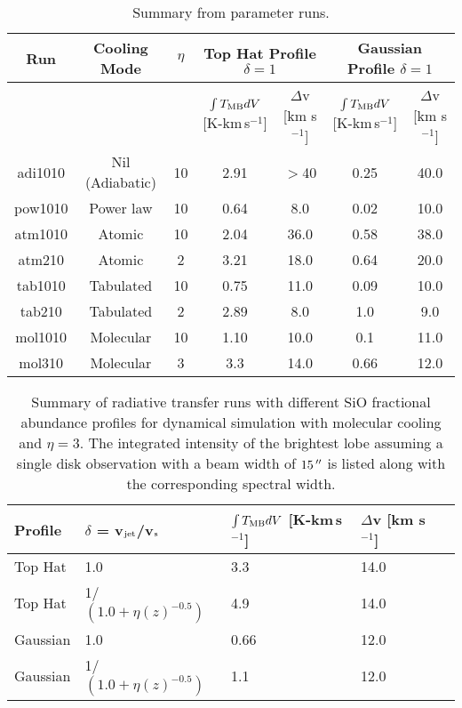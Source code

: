 \documentclass[useAMS,usenatbib,letters]{mn2e}
\begin{document}
\begin{table*}
\centering
\caption{Summary from parameter runs.}
\begin{tabular}{c | c | c | c | c | c | c }
\hline
Run & Cooling Mode & $\eta$ & \multicolumn{2}{|c|}{Top Hat Profile
  $\delta = 1$} & \multicolumn{2}{|c|}{Gaussian Profile $\delta =
  1$}\\
\hline\hline
&&& $\int T_{\rm MB}dV$ [K-km\,s$^{-1}$] & $\Delta$v [km s$^{-1}$] & $\int T_{\rm MB}dV$ [K-km\,s$^{-1}$] & $\Delta$v [km s$^{-1}$] \\
\hline
adi1010 & Nil (Adiabatic) & 10 & 2.91 & $>$40 & 0.25 & 40.0 \\
pow1010 & Power law & 10 & 0.64 & 8.0 & 0.02 & 10.0\\
atm1010 & Atomic & 10 & 2.04 & 36.0 & 0.58 & 38.0 \\
atm210 & Atomic & 2 & 3.21 & 18.0 & 0.64 & 20.0 \\
tab1010 & Tabulated & 10 & 0.75 & 11.0 & 0.09 & 10.0 \\
tab210 & Tabulated & 2 & 2.89 & 8.0 & 1.0 & 9.0 \\
mol1010 & Molecular & 10 & 1.10 & 10.0 & 0.1 & 11.0 \\
mol310 & Molecular & 3 & 3.3 & 14.0 & 0.66 & 12.0\\
\hline
\end{tabular}
\label{tab:result1}
\end{table*}


 

\begin{table*}
\centering
\caption{Summary of radiative transfer runs with different SiO fractional abundance
  profiles for dynamical simulation with molecular cooling and
  $\eta=3$. The integrated intensity of the brightest lobe assuming a single disk
  observation with a beam width of $15\,\hbox{$^{\prime\prime}$}$ is listed along with the
  corresponding spectral width.}
\begin{tabular}{l | l | l | l | l}
\hline
Profile & $\delta$ = v$_{\rm jet}$/v$_{\rm s}$ & $\int T_{\rm MB}dV$
[K-km\,s$^{-1}$] & $\Delta$v [km s$^{-1}$]\\ 
\hline\hline
Top Hat & 1.0 & 3.3 & 14.0 \\
Top Hat & 1/$(1.0 + \eta(z)^{-0.5})$ & 4.9 & 14.0 \\
Gaussian & 1.0 & 0.66
& 12.0 \\
Gaussian & 1/$(1.0 + \eta(z)^{-0.5})$ & 1.1
& 12.0 \\
\hline
\end{tabular}
\label{tab:result2}
\end{table*}
\end{document}
